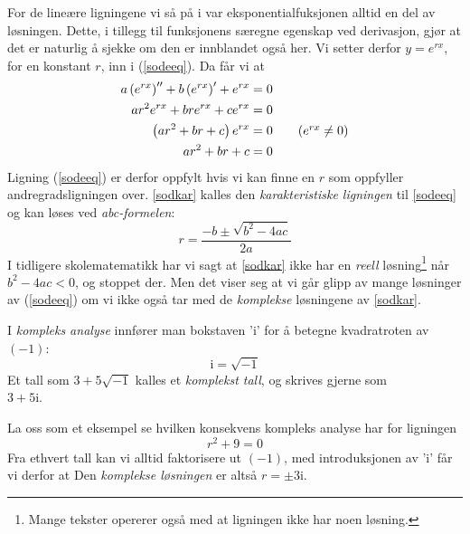 For de lineære ligningene vi så på i  var eksponentialfuksjonen alltid en del av løsningen. Dette, i tillegg til funksjonens særegne egenskap ved derivasjon, gjør at det er naturlig å sjekke om den er innblandet også her. Vi setter derfor $ {y=e^{rx} }$, for en konstant $ r $, inn i (\ref{sodeeq}). Da får vi at
\begin{align}
	a\left(e^{rx}\right)''+b\left(e^{rx}\right)'+ e^{rx} &= 0\nonumber \\
	ar^2e^{rx}+ bre^{rx} + ce^{rx}&= 0\nonumber\\
	\left(ar^2 + br + c\right)e^{rx} &= 0 \tag{$ e^{rx}\neq 0 $}\nonumber \\
	ar^2 + br + c &= 0 \label{sodkar}
\end{align}
Ligning (\ref{sodeeq}) er derfor oppfylt hvis vi kan finne en $ r $ som oppfyller andregradsligningen over. \eqref{sodkar} kalles den \textit{karakteristiske ligningen} til \eqref{sodeeq} og kan løses ved \textit{abc-formelen}:
\[ r = \frac{-b\pm\sqrt{b^2-4ac}}{2a} \]
I tidligere skolematematikk har vi sagt at \eqref{sodkar} ikke har en \textit{reell} løsning\footnote{Mange tekster opererer også med at ligningen ikke har noen løsning.}\label{rkmpstart} når  ${ b^2-4ac<0 }$, og stoppet der. Men det viser seg at vi går glipp av mange løsninger av (\ref{sodeeq}) om vi ikke også tar med de \textit{komplekse} løsningene av \eqref{sodkar}.\vsk

I \textit{kompleks analyse} innfører man bokstaven 'i' for å betegne kvadratroten av $( -1) $:
\[ \mathrm{i}=\sqrt{-1} \]
Et tall som $ 3+5\sqrt{-1} $ kalles et \textit{komplekst tall}, og skrives gjerne som \\$ 3+5\mathrm{i} $.\vsk

La oss som et eksempel se hvilken konsekvens kompleks analyse har for ligningen
\[ r^2 +9 = 0  \]
Fra ethvert tall kan vi alltid faktorisere ut $ (-1) $, med introduksjonen av 'i' får vi derfor at
Den \textit{komplekse løsningen} er altså $ r=\pm 3\mathrm{i} $.\vsk

